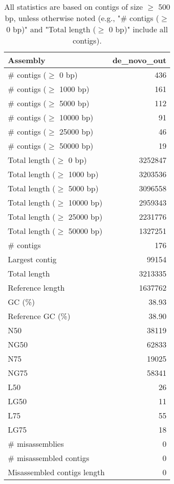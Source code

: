 \documentclass[12pt,a4paper]{article}
\begin{document}
\begin{table}[ht]
\begin{center}
\caption{All statistics are based on contigs of size $\geq$ 500 bp, unless otherwise noted (e.g., "\# contigs ($\geq$ 0 bp)" and "Total length ($\geq$ 0 bp)" include all contigs).}
\begin{tabular}{|l*{1}{|r}|}
\hline
Assembly & de\_novo\_out \\ \hline
\# contigs ($\geq$ 0 bp) & 436 \\ \hline
\# contigs ($\geq$ 1000 bp) & 161 \\ \hline
\# contigs ($\geq$ 5000 bp) & 112 \\ \hline
\# contigs ($\geq$ 10000 bp) & 91 \\ \hline
\# contigs ($\geq$ 25000 bp) & 46 \\ \hline
\# contigs ($\geq$ 50000 bp) & 19 \\ \hline
Total length ($\geq$ 0 bp) & 3252847 \\ \hline
Total length ($\geq$ 1000 bp) & 3203536 \\ \hline
Total length ($\geq$ 5000 bp) & 3096558 \\ \hline
Total length ($\geq$ 10000 bp) & 2959343 \\ \hline
Total length ($\geq$ 25000 bp) & 2231776 \\ \hline
Total length ($\geq$ 50000 bp) & 1327251 \\ \hline
\# contigs & 176 \\ \hline
Largest contig & 99154 \\ \hline
Total length & 3213335 \\ \hline
Reference length & 1637762 \\ \hline
GC (\%) & 38.93 \\ \hline
Reference GC (\%) & 38.90 \\ \hline
N50 & 38119 \\ \hline
NG50 & 62833 \\ \hline
N75 & 19025 \\ \hline
NG75 & 58341 \\ \hline
L50 & 26 \\ \hline
LG50 & 11 \\ \hline
L75 & 55 \\ \hline
LG75 & 18 \\ \hline
\# misassemblies & 0 \\ \hline
\# misassembled contigs & 0 \\ \hline
Misassembled contigs length & 0 \\ \hline

\end{tabular}
\end{center}
\end{table}
\end{document}
